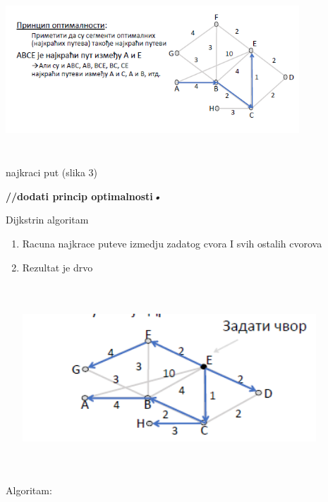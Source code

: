 \documentclass{article} %
\begin{document}
\begin{enumerate}
\begin{center}
			\includegraphics[width=11cm, height=7cm]{najkraciPut3}\\
			najkraci put (slika 3)
		\end{center}

		\textbf{//dodati princip optimalnosti\textit{•}}
\end{enumerate}
\break
Dijkstrin algoritam
\begin{enumerate}
	\item Racuna najkrace puteve izmedju zadatog cvora I svih ostalih cvorova
	\item Rezultat je drvo
	\begin{center}
		\includegraphics[width=11cm, height=7cm]{da}\\
	\end{center}
\end{enumerate}
Algoritam:
\end{document}
